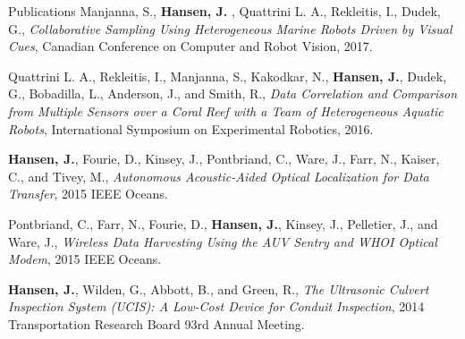 \documentclass{resume} %
\begin{document}
\begin{rSection}{Publications}
Manjanna, S., \textbf{ Hansen, J. }, Quattrini L. A., Rekleitis, I., Dudek, G., 
\textit{Collaborative Sampling Using Heterogeneous Marine Robots Driven by Visual Cues}, Canadian Conference on Computer and Robot Vision, 2017. 
                
Quattrini L. A., Rekleitis, I., Manjanna, S., Kakodkar, N., \textbf{Hansen, J.},   Dudek, G.,  Bobadilla, L.,  Anderson, J., and Smith, R.,
            \textit{Data Correlation and Comparison from Multiple Sensors over a Coral Reef with a Team of Heterogeneous Aquatic Robots},
             International Symposium on Experimental Robotics,
              2016.

\textbf{Hansen, J.}, Fourie, D., Kinsey, J., Pontbriand, C., Ware, J., Farr, N., Kaiser, C., and Tivey, M., \textit{Autonomous Acoustic-Aided Optical Localization for Data Transfer}, 2015 IEEE Oceans.

Pontbriand, C., Farr, N., Fourie, D., \textbf{Hansen, J.},  Kinsey, J., Pelletier, J., and Ware, J., 
 \textit{Wireless Data Harvesting Using the AUV Sentry and WHOI Optical Modem}, 2015 IEEE Oceans.

\textbf{Hansen, J.}, Wilden, G., Abbott, B., and Green, R., \textit{The Ultrasonic Culvert
Inspection System (UCIS): A Low-Cost Device for Conduit Inspection}, 2014 Transportation
Research Board 93rd Annual Meeting. 
\end{rSection}
\end{document}
